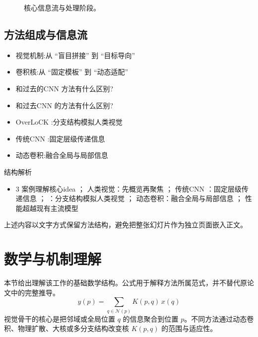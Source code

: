 \documentclass[UTF8,11pt,a4paper]{ctexart}
\begin{document}
\begin{figure}[H]
\centering
{}
\caption{核心信息流与处理阶段。}
\end{figure}

\subsection{方法组成与信息流}
\begin{itemize}
\item 视觉机制:从 “盲目拼接” 到 “目标导向”
\item 卷积核:从 “固定模板” 到 “动态适配”
\item 和过去的CNN 方法有什么区别?
\item 和过去CNN 的方法有什么区别?
\item OverLoCK :分支结构模拟人类视觉
\item 传统CNN :固定层级传递信息
\item 动态卷积:融合全局与局部信息
\end{itemize}

\begin{keybox}{结构解析}
\begin{itemize}
\item 3 案例理解核心idea ； 人类视觉：先概览再聚焦 ； 传统CNN ：固定层级传递信息 ； ：分支结构模拟人类视觉 ； 动态卷积：融合全局与局部信息 ； 性能超越现有主流模型
\end{itemize}
\end{keybox}

上述内容以文字方式保留方法结构，避免把整张幻灯片作为独立页面嵌入正文。

\section{数学与机制理解}
本节给出理解该工作的基础数学结构。公式用于解释方法所属范式，并不替代原论文中的完整推导。
\begin{equation}
y(p)=\sum_{q\in\mathcal N(p)}K(p,q)\,x(q)
\end{equation}
视觉骨干的核心是把邻域或全局位置 $q$ 的信息聚合到位置 $p$。不同方法通过动态卷积、物理扩散、大核或多分支结构改变核 $K(p,q)$ 的范围与适应性。
\end{document}
